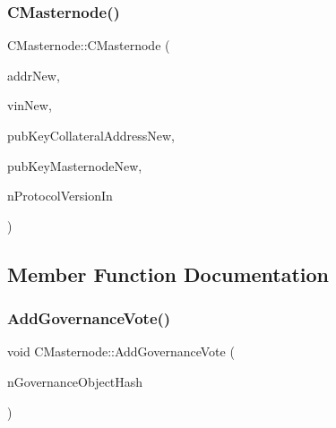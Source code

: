 \mbox{\label{class_c_masternode_ae11e8917ed00c7cee11dc5fdb211ecb1}} 
\subsubsection{\texorpdfstring{C\+Masternode()}{CMasternode()}\hspace{0.1cm}{\footnotesize\ttfamily [4/4]}}
{\footnotesize\ttfamily C\+Masternode\+::\+C\+Masternode (\begin{DoxyParamCaption}\item[{\mbox{\hyperlink{class_c_service}{C\+Service}}}]{addr\+New,  }\item[{C\+Tx\+In}]{vin\+New,  }\item[{\mbox{\hyperlink{class_c_pub_key}{C\+Pub\+Key}}}]{pub\+Key\+Collateral\+Address\+New,  }\item[{\mbox{\hyperlink{class_c_pub_key}{C\+Pub\+Key}}}]{pub\+Key\+Masternode\+New,  }\item[{int}]{n\+Protocol\+Version\+In }\end{DoxyParamCaption})}



\subsection{Member Function Documentation}
\mbox{\label{class_c_masternode_a24919d0a7c97271ac4fd4e8f8ae0a42c}} 
\subsubsection{\texorpdfstring{Add\+Governance\+Vote()}{AddGovernanceVote()}}
{\footnotesize\ttfamily void C\+Masternode\+::\+Add\+Governance\+Vote (\begin{DoxyParamCaption}\item[{\mbox{\hyperlink{classuint256}{uint256}}}]{n\+Governance\+Object\+Hash }\end{DoxyParamCaption})}

\mbox{\label{class_c_masternode_abfee4bc30fa436d9a5f8b5f15a078081}} 
